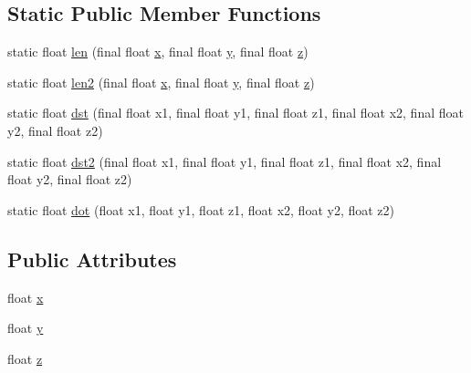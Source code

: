 \subsection*{Static Public Member Functions}
\begin{DoxyCompactItemize}
\item 
static float \hyperlink{classairhockeyjava_1_1util_1_1_vector3_adf86f65310de2d472922dea97ef00c7d}{len} (final float \hyperlink{classairhockeyjava_1_1util_1_1_vector3_add3a8daf296cb430735992206882c365}{x}, final float \hyperlink{classairhockeyjava_1_1util_1_1_vector3_ae3a7f0828f0f74bfdf145b570b3c9e68}{y}, final float \hyperlink{classairhockeyjava_1_1util_1_1_vector3_a9dd7662215506c01424bf8d953ec2117}{z})
\item 
static float \hyperlink{classairhockeyjava_1_1util_1_1_vector3_ad1f08399f49bf5b3ff42896f9ca0d67c}{len2} (final float \hyperlink{classairhockeyjava_1_1util_1_1_vector3_add3a8daf296cb430735992206882c365}{x}, final float \hyperlink{classairhockeyjava_1_1util_1_1_vector3_ae3a7f0828f0f74bfdf145b570b3c9e68}{y}, final float \hyperlink{classairhockeyjava_1_1util_1_1_vector3_a9dd7662215506c01424bf8d953ec2117}{z})
\item 
static float \hyperlink{classairhockeyjava_1_1util_1_1_vector3_aa49075f78d0d44e17fac5b4dc60bebc1}{dst} (final float x1, final float y1, final float z1, final float x2, final float y2, final float z2)
\item 
static float \hyperlink{classairhockeyjava_1_1util_1_1_vector3_acd86338537b97c5c8952883d79b2ceba}{dst2} (final float x1, final float y1, final float z1, final float x2, final float y2, final float z2)
\item 
static float \hyperlink{classairhockeyjava_1_1util_1_1_vector3_aacd4cabbae65c49fd293236cca2cb378}{dot} (float x1, float y1, float z1, float x2, float y2, float z2)
\end{DoxyCompactItemize}
\subsection*{Public Attributes}
\begin{DoxyCompactItemize}
\item 
float \hyperlink{classairhockeyjava_1_1util_1_1_vector3_add3a8daf296cb430735992206882c365}{x}
\item 
float \hyperlink{classairhockeyjava_1_1util_1_1_vector3_ae3a7f0828f0f74bfdf145b570b3c9e68}{y}
\item 
float \hyperlink{classairhockeyjava_1_1util_1_1_vector3_a9dd7662215506c01424bf8d953ec2117}{z}
\end{DoxyCompactItemize}
